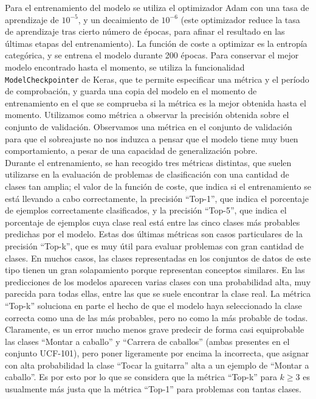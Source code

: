 \documentclass[../main.tex]{memoir}
\begin{document}
Para el entrenamiento del modelo se utiliza el optimizador Adam con
una tasa de aprendizaje de $10^{-5}$, y un decaimiento de $10^{-6}$
(este optimizador reduce la tasa de aprendizaje tras cierto número de
épocas, para afinar el resultado en las últimas etapas del
entrenamiento). La función de coste a optimizar es la entropía
categórica, y se entrena el modelo durante 200 épocas. Para conservar
el mejor modelo encontrado hasta el momento, se utiliza la
funcionalidad \texttt{ModelCheckpointer} de Keras, que te permite
especificar una métrica y el período de comprobación, y guarda una
copia del modelo en el momento de entrenamiento en el que se comprueba
si la métrica es la mejor obtenida hasta el momento. Utilizamos como
métrica a observar la precisión obtenida sobre el conjunto de
validación. Observamos una métrica en el conjunto de validación para
que el sobreajuste no nos induzca a pensar que el modelo tiene muy
buen comportamiento, a pesar de una capacidad de generalización pobre.\\

Durante el entrenamiento, se han recogido tres métricas distintas, que
suelen utilizarse en la evaluación de problemas de clasificación con
una cantidad de clases tan amplia; el valor de la función de coste,
que indica si el entrenamiento se está llevando a cabo correctamente,
la precisión ``Top-1'', que indica el porcentaje de ejemplos
correctamente clasificados, y la precisión ``Top-5'', que indica el
porcentaje de ejemplos cuya clase real está entre las cinco clases más
probables predichas por el modelo. Estas dos últimas métricas son
casos particulares de la precisión ``Top-k'', que es muy útil para
evaluar problemas con gran cantidad de clases. En muchos casos, las
clases representadas en los conjuntos de datos de este tipo tienen un
gran solapamiento porque representan conceptos similares. En las
predicciones de los modelos aparecen varias clases con una
probabilidad alta, muy parecida para todas ellas, entre las que se
suele encontrar la clase real. La métrica ``Top-k'' soluciona en parte
el hecho de que el modelo haya seleccionado la clase correcta como una
de las más probables, pero no como la más probable de
todas. Claramente, es un error mucho menos grave predecir de forma
casi equiprobable las clases ``Montar a caballo'' y ``Carrera de
caballos'' (ambas presentes en el conjunto UCF-101), pero poner
ligeramente por encima la incorrecta, que asignar con alta
probabilidad la clase ``Tocar la guitarra'' alta a un ejemplo de
``Montar a caballo''. Es por esto por lo que se considera que la
métrica ``Top-k'' para $k \geq 3$ es usualmente más justa que la
métrica ``Top-1'' para problemas con tantas clases.\\
\end{document}
